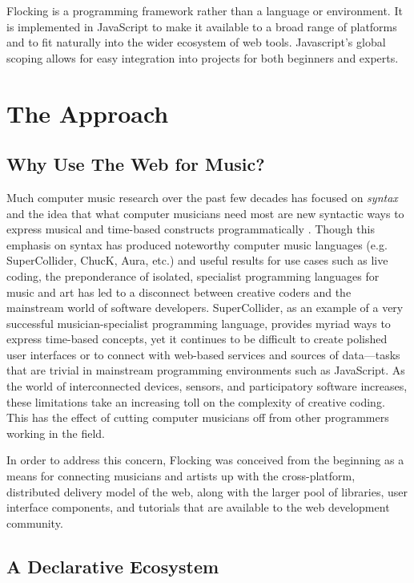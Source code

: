 \documentclass{article}
\begin{document}
Flocking is a programming framework rather than a language or environment. It is implemented in JavaScript to make it available to a broad range of platforms and to fit naturally into the wider ecosystem of web tools. Javascript's global scoping allows for easy integration into projects for both beginners and experts.

\section{The Approach}

\subsection{Why Use The Web for Music?}

Much computer music research over the past few decades has focused on {\it syntax} and the idea that what computer musicians need most are new syntactic ways to express musical and time-based constructs programmatically \cite{dannenberg2002language,wang2003chuck,mccartney1996supercollider,Puckette96puredata}. Though this emphasis on syntax has produced noteworthy computer music languages (e.g. SuperCollider, ChucK, Aura, etc.) and useful results for use cases such as live coding, the preponderance of isolated, specialist programming languages for music and art has led to a disconnect between creative coders and the mainstream world of software developers. SuperCollider, as an example of a very successful musician-specialist programming language, provides myriad ways to express time-based concepts, yet it continues to be difficult to create polished user interfaces or to connect with web-based services and sources of data---tasks that are trivial in mainstream programming environments such as JavaScript. As the world of interconnected devices, sensors, and participatory software increases, these limitations take an increasing toll on the complexity of creative coding. This has the effect of cutting computer musicians off from other programmers working in the field.

In order to address this concern, Flocking was conceived from the beginning as a means for connecting musicians and artists up with the cross-platform, distributed delivery model of the web, along with the larger pool of libraries, user interface components, and tutorials that are available to the web development community.

\subsection{A Declarative Ecosystem}
\end{document}
